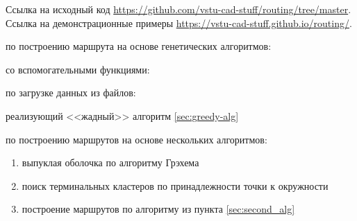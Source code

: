 \resumecontents
{}

Ссылка на исходный код \url{https://github.com/vstu-cad-stuff/routing/tree/master}.
Ссылка на демонстрационные примеры \url{https://vstu-cad-stuff.github.io/routing/}.

 по построению маршрута на основе генетических алгоритмов:


\pagebreak

 со вспомогательными функциями:


 по загрузке данных из файлов:


\pagebreak

 реализующий <<жадный>> алгоритм \ref{sec:greedy-alg}


\pagebreak

 по построению маршрутов на основе нескольких алгоритмов:
\begin{enumerate}
    \item выпуклая оболочка по алгоритму Грэхема
    \item поиск терминальных кластеров по принадлежности точки к окружности
    \item построение маршрутов по алгоритму из пункта \ref{sec:second_alg}
\end{enumerate}
